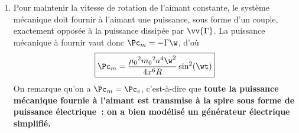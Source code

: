 \documentclass[a4paper, 10pt, final, garamond]{book}
\begin{document}
\begin{enumerate}
	      à vitesse angulaire $\w$ supposée positive autour de $\uz$, alors
	      \begin{DispWithArrows*}[]
		      \vv{\Gamma} &= m_0 [\cos(\wt)\ux + \sin(\wt)\uy]
		      \wedge {}\sin(\wt) \ux
		      \\\Lra
	      \end{DispWithArrows*}
	      \begin{tror}{Vérification}
		      Ici encore, le couple est porté par $-\uz$, c'est-à-dire qu'il
		      \textbf{résiste} au mouvement de l'aimant. D'après la loi de
		      \textsc{Lenz}, c'est complètement normal, puisque ce couple est
		      d'origine inductive, et que la cause de ce phénomène d'induction est
		      le mouvement de l'aimant.
	      \end{tror}
	\item Pour maintenir la vitesse de rotation de l'aimant constante, le système
	      mécanique doit fournir à l'aimant une puissance, sous forme d'un couple,
	      exactement opposée à la puissance dissipée par $\vv{\Gamma}$. La
	      puissance mécanique à fournir vaut donc $\Pc_m = -\Gamma\w$, d'où
	      \[
		      \boxed{\Pc_m = \frac{\mu_0{}^{2}m_0{}^{2}a^4\w^2}{4x^6R}\sin^2(\wt)}
	      \]
	      On remarque qu'on a $\Pc_m = \Pc_e$, c'est-à-dire que \textbf{toute la
		      puissance mécanique fournie à l'aimant est transmise à la spire sous
		      forme de puissance électrique~: on a bien modélisé un générateur
		      électrique simplifié.}
\end{enumerate}
\end{document}
